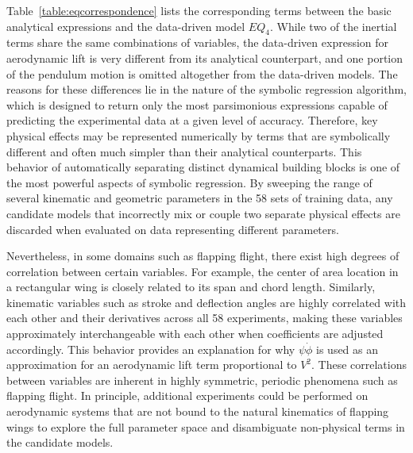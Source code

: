 \documentclass{article}
\begin{document}

Table~\ref{table:eqcorrespondence} lists the corresponding terms between the
basic analytical expressions and the data-driven model $EQ_4$.  While two of the
inertial terms share the same combinations of variables, the data-driven
expression for aerodynamic lift is very different from its analytical
counterpart, and one portion of the pendulum motion is omitted altogether from
the data-driven models.  The reasons for these differences lie in the nature of
the symbolic regression algorithm, which is designed to return only the most
parsimonious expressions capable of predicting the experimental data at a given
level of accuracy.  Therefore, key physical effects may be represented
numerically by terms that are symbolically different and often much simpler than
their analytical counterparts.  This behavior of automatically separating
distinct dynamical building blocks is one of the most powerful aspects of
symbolic regression.  By sweeping the range of several kinematic and geometric
parameters in the 58 sets of training data, any candidate models that
incorrectly mix or couple two separate physical effects are discarded when
evaluated on data representing different parameters.

Nevertheless, in some domains such as flapping flight, there exist high degrees
of correlation between certain variables.  For example, the center of area
location in a rectangular wing is closely related to its span and chord length.
Similarly, kinematic variables such as stroke and deflection angles are highly
correlated with each other and their derivatives across all 58 experiments,
making these variables approximately interchangeable with each other when
coefficients are adjusted accordingly.  This behavior provides an explanation
for why \(\psi\dot{\phi}\) is used as an approximation for an aerodynamic lift
term proportional to \(V^2\).  These correlations between variables are
inherent in highly symmetric, periodic phenomena such as flapping flight.  In
principle, additional experiments could be performed on aerodynamic systems that
are not bound to the natural kinematics of flapping wings to explore the full
parameter space and disambiguate non-physical terms in the candidate models.
\end{document}
